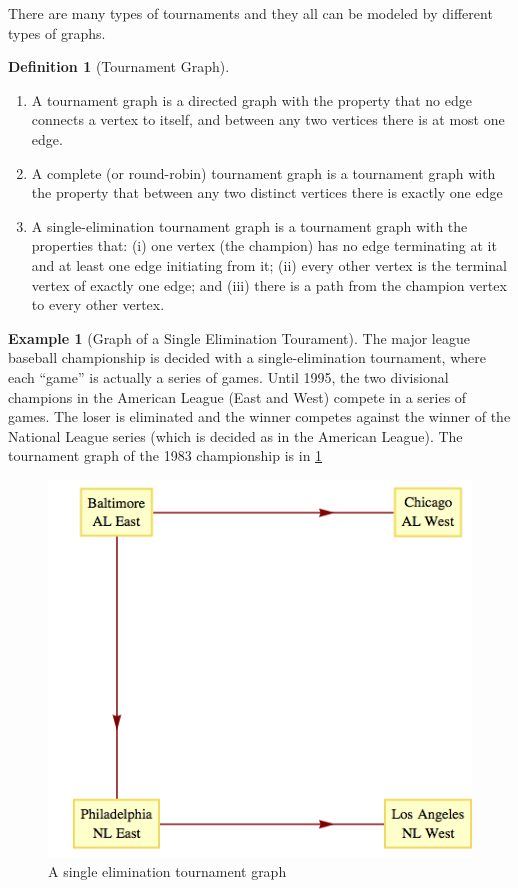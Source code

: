 \documentclass[10pt,]{book}
\theoremstyle{plain}
\theoremstyle{definition}
\newtheorem{definition}[theorem]{Definition}
\theoremstyle{definition}
\theoremstyle{definition}
\newtheorem{example}[theorem]{Example}
\theoremstyle{definition}
\theoremstyle{definition}
\numberwithin{equation}{section}
\begin{document}
\par
There are many types of tournaments and they all can be modeled by different types of graphs.%
\begin{definition}[Tournament Graph]\label{def-tournament-graph}
\leavevmode%
\begin{enumerate}[label=\alph*]
\item\hypertarget{li-1}{} A tournament graph is a directed graph with the property that no edge connects a vertex to itself, and between any two vertices there is at most one edge.%
\item\hypertarget{li-2}{}A complete (or round-robin) tournament graph is a tournament graph with the property that between any two distinct vertices there is exactly
one edge%
\item\hypertarget{li-3}{}A single-elimination tournament graph is a tournament graph with the properties that: (i) one vertex (the champion) has no edge terminating
at it and at least one edge initiating from it; (ii) every other vertex is the terminal vertex of exactly one edge; and (iii) there is a path from
the champion vertex to every other vertex.%
\end{enumerate}
%
\end{definition}
\begin{example}[Graph of a Single Elimination Tourament]\label{ex-single-elimination-9-1}
 The major league baseball championship is decided with a single-elimination tournament, where each ``game'' is actually
a series of games. Until 1995, the two divisional champions in the American League (East and West) compete in a series of games. The loser is eliminated and the winner competes against the winner of the National League series (which is decided as in the American League). The tournament graph of the
1983 championship is in \hyperref[fig-mlb-1983-9-1]{\ref{fig-mlb-1983-9-1}}%
\leavevmode%
\begin{figure}
\centering
\includegraphics[width=1\linewidth]{images/fig-mlb-1983-9-1.png}
\caption{A single elimination tournament graph
		 \label{fig-mlb-1983-9-1}}
\end{figure}
\end{example}
\end{document}
